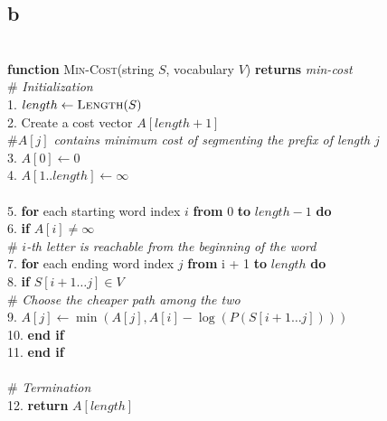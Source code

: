 \documentclass{article}
\numberwithin{equation}{section}
\begin{document}
    \subsection*{b}
    \begin{tabbing}
    \\
    \textbf{function} \textsc{Min-Cost}(string $S$, vocabulary $V$) \textbf{returns} \textit{min-cost} \\
    \quad \# \textit{Initialization} \\
    1. \quad $length \leftarrow \textsc{Length}(S)$ \\
    2. \quad Create a cost vector $A[length + 1]$ \\
       \quad\quad \textit{$\# A[j]$ contains minimum cost of segmenting the prefix of length $j$} \\
    3. \quad $A[0] \leftarrow 0$ \\
    4. \quad $A[1 .. length] \leftarrow \infty$ \\
    \\
    5. \quad \textbf{for} each starting word index $i$ \textbf{from} 0 \textbf{to} $length - 1$ \textbf{do} \\
    6. \quad\quad \textbf{if} $A[i] \neq \infty$ \\
       \quad\quad\quad \# \textit{$i$-th letter is reachable from the beginning of the word} \\
    7. \quad\quad\quad \textbf{for} each ending word index $j$ \textbf{from} i + 1 \textbf{to} $length$ \textbf{do} \\
    8. \quad\quad\quad\quad \textbf{if} $S[i + 1 \dots j] \in V$ \\
       \quad\quad\quad\quad\quad \# \textit{Choose the cheaper path among the two} \\
    9. \quad\quad\quad\quad\quad $A[j] \leftarrow \min(A[j], A[i] - \log(P(S[i + 1 \dots j])))$ \\
    10. \quad\quad\quad\textbf{end if} \\
    11. \quad \textbf{end if}
    \\
    \\
    \quad \# \textit{Termination} \\
    12. \quad \textbf{return} $A[length]$
    \end{tabbing}
\end{document}
